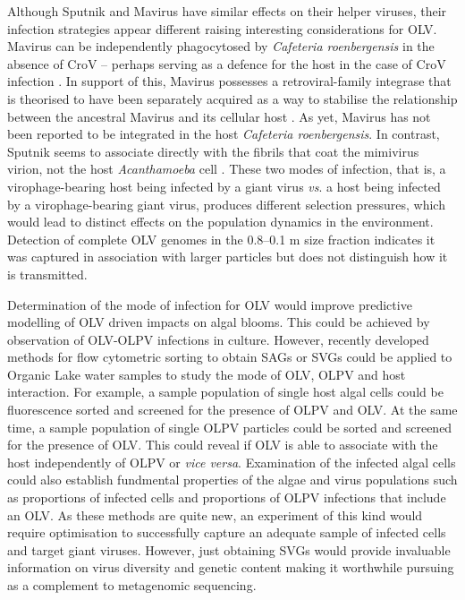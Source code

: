 Although Sputnik and Mavirus have similar effects on their helper viruses, their infection strategies appear different raising interesting considerations for \ac{OLV}.
Mavirus can be independently phagocytosed by \emph{Cafeteria roenbergensis} in the absence of \ac{CroV} -- perhaps serving as a defence for the host in the case of \ac{CroV} infection \cite{Fischer2011a}.
In support of this, Mavirus possesses a retroviral-family integrase that is theorised to have been separately acquired as a way to stabilise the relationship between the ancestral Mavirus and its cellular host \cite{Fischer2011a}.
As yet, Mavirus has not been reported to be integrated in the host \emph{Cafeteria roenbergensis}.
In contrast, Sputnik seems to associate directly with the fibrils that coat the mimivirus virion, not the host \emph{Acanthamoeba} cell \cite{Boyer2011}.
These two modes of infection, that is, a virophage-bearing host being infected by a giant virus \emph{vs}. a host being infected by a virophage-bearing giant virus, produces different selection pressures, which would lead to distinct effects on the population dynamics in the environment.
Detection of complete \ac{OLV} genomes in the 0.8--0.1 \textmu{}m size fraction indicates it was captured in association with larger particles but does not distinguish how it is transmitted.

Determination of the mode of infection for \ac{OLV} would improve predictive modelling of \ac{OLV} driven impacts on algal blooms.
This could be achieved by observation of \ac{OLV}-\ac{OLPV} infections in culture.
However, recently developed methods for flow cytometric sorting to obtain \acp{SAG} or \acp{SVG} \cite{Martinez-Martinez2011, Allen2011} could be applied to Organic Lake water samples to study the mode of \ac{OLV}, \ac{OLPV} and host interaction.
For example, a sample population of single host algal cells could be fluorescence sorted and screened for the presence of \ac{OLPV} and \ac{OLV}.
At the same time, a sample population of single \ac{OLPV} particles could be sorted and screened for the presence of \ac{OLV}.
This could reveal if \ac{OLV} is able to associate with the host independently of \ac{OLPV} or \emph{vice versa}.
Examination of the infected algal cells could also establish fundmental properties of the algae and virus populations such as proportions of infected cells and proportions of \ac{OLPV} infections that include an \ac{OLV}.
As these methods are quite new, an experiment of this kind would require optimisation to successfully capture an adequate sample of infected cells and target giant viruses.
However, just obtaining \acp{SVG} would provide invaluable information on virus diversity and genetic content making it worthwhile pursuing as a complement to metagenomic sequencing.

